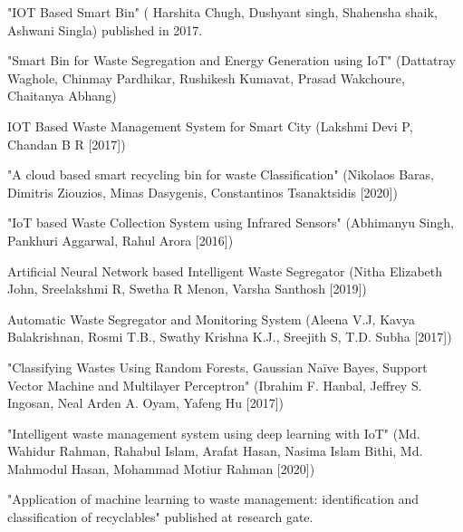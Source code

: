 \newpage
{}
\begin{thebibliography}{99}
   "IOT Based Smart Bin" ( Harshita Chugh, Dushyant singh, Shahensha shaik, Ashwani Singla) published in 2017.

"Smart Bin for Waste Segregation and Energy Generation using IoT"
(Dattatray Waghole, Chinmay Pardhikar, Rushikesh Kumavat, Prasad Wakchoure, Chaitanya Abhang)

IOT Based Waste Management System for Smart City
(Lakshmi Devi P, Chandan B R [2017])

"A cloud based smart recycling bin for waste Classification"
(Nikolaos Baras, Dimitris Ziouzios, Minas Dasygenis, Constantinos Tsanaktsidis [2020])

"IoT based Waste Collection System using Infrared Sensors"
(Abhimanyu Singh, Pankhuri Aggarwal, Rahul Arora [2016])

Artificial Neural Network based Intelligent Waste Segregator
(Nitha Elizabeth John, Sreelakshmi R, Swetha R Menon, Varsha Santhosh [2019])

Automatic Waste Segregator and Monitoring System
(Aleena V.J,  Kavya Balakrishnan, Rosmi T.B., Swathy Krishna K.J., Sreejith S, T.D. Subha [2017])

"Classifying Wastes Using Random Forests, Gaussian Naïve Bayes, Support Vector Machine and Multilayer Perceptron" (Ibrahim F. Hanbal, Jeffrey S. Ingosan, Neal Arden A. Oyam, Yafeng Hu [2017])


 "Intelligent waste management system using deep learning with IoT" (Md. Wahidur Rahman, Rahabul Islam, Arafat Hasan, Nasima Islam Bithi, Md. Mahmodul Hasan, Mohammad Motiur Rahman [2020])

 "Application of machine learning to waste management: identification and classification of recyclables" published at research gate.





\end{thebibliography}


